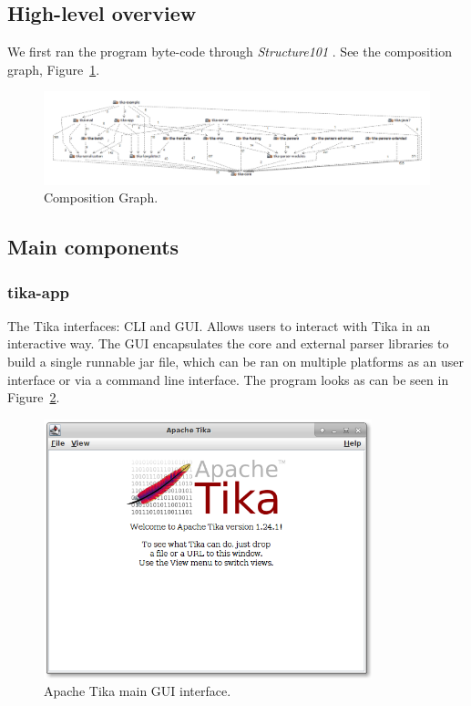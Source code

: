 \documentclass{article}
\begin{document}
\subsection{High-level overview}
We first ran the program byte-code through \textit{Structure101} \citep{chedgeystructure101}. See the composition graph, Figure~\ref{fig:composition}.

\newpage
{}
\begin{figure}[ht]
    \centering
    \includegraphics[width=1\textwidth]{report/images/tika.png}
    \caption{Composition Graph.}
    \label{fig:composition}
    
\end{figure}
\restoregeometry
\pagebreak

\subsection{Main components}
\subsubsection{tika-app}
The Tika interfaces: CLI and GUI. Allows users to interact with Tika in an interactive way. The GUI encapsulates the core and external parser libraries to build a single runnable jar file, which can be ran on multiple platforms as an user interface or via a command line interface. The program looks as can be seen in Figure~\ref{fig:tika_app/main}.

\begin{figure}[ht]
    \centering
    \includegraphics[width=0.85\textwidth]{report/images/tika_app/main.png}
    \caption{Apache Tika main GUI interface.}
    \label{fig:tika_app/main}
\end{figure}
\end{document}
